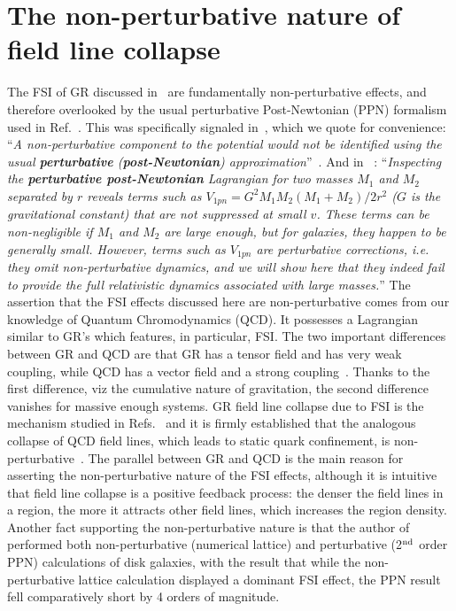 \documentclass[superscriptaddress,amsmath,amssymb,nofootinbib]{revtex4}
\begin{document}
\section{The non-perturbative nature of field line collapse \label{Point 1}} 
%
The FSI of GR discussed in~\cite{Deur:2009ya, Deur:2016bwq, Deur:2017aas} are fundamentally non-perturbative effects, %
and therefore overlooked by the usual perturbative Post-Newtonian (PPN) formalism~\cite{Einstein:1938yz} used in Ref.~\cite{Barker:2023xsx}. 
This was specifically signaled in~\cite{Deur:2016bwq, Deur:2020wlg}, which we quote for convenience: ``{\it A non-perturbative component to the potential would not be identified using the usual \textbf{perturbative} (\textbf{post-Newtonian}) approximation}''~\cite{Deur:2016bwq}. 
And in ~\cite{Deur:2020wlg}: ``{\it Inspecting the \textbf{perturbative post-Newtonian} Lagrangian for two masses $M_1$ and $M_2$ separated 
by $r$ reveals  terms such as $V_{1pn}=G^2M_{1}M_{2}(M_{1}+M_{2})/2r^2$ 
($G$ is the gravitational constant) that are not suppressed at small $v$. These terms can be non-negligible if
$M_1$ and $M_2$ are large enough, but for galaxies, they happen to be generally small. However,  terms such as $V_{1pn}$  
are {\it{perturbative}} corrections, i.e. they omit non-perturbative dynamics, and we will show here that they indeed fail to provide  
the full relativistic dynamics  associated with large masses.}'' %
The assertion that the FSI effects discussed here are non-perturbative comes from our knowledge of Quantum Chromodynamics (QCD).
It possesses  a Lagrangian similar to 
GR's which features, in particular, FSI. The two important differences between GR and QCD are that GR has a tensor field and has very weak coupling, 
while QCD has a vector field and a strong coupling~\cite{Deur:2016tte}. 
Thanks to the first difference, viz the cumulative nature of gravitation, the second difference vanishes for massive enough systems. 
GR field line collapse due to FSI is the mechanism studied in Refs.~\cite{Deur:2009ya, Deur:2016bwq, Deur:2017aas} and
it is firmly established that the analogous collapse of QCD field lines, which leads to static quark confinement, is non-perturbative~\cite{the: Greensite conf.}. 
The parallel between GR and QCD is the main reason for  %
asserting the non-perturbative nature of the FSI effects, although it is intuitive that field line collapse is a positive feedback process: 
the denser the field lines in a region, the more it attracts other field lines, which increases the region density.
Another fact supporting the non-perturbative nature is that the author of~\cite{Deur:2009ya, Deur:2016bwq, Deur:2017aas} performed both 
non-perturbative (numerical lattice) 
and perturbative (2$^{\rm nd}$ order PPN) calculations of disk galaxies, with the result that while the non-perturbative lattice calculation displayed a dominant 
FSI effect, the PPN result fell comparatively short by 4 orders of magnitude. 
\end{document}
